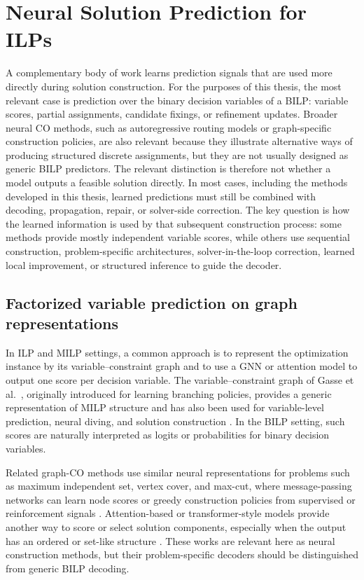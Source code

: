 \section{Neural Solution Prediction for ILPs}
\label{sec:rw_solution_prediction}

A complementary body of work learns prediction signals that are used more directly during solution construction. For the purposes of this thesis, the most relevant case is prediction over the binary decision variables of a BILP: variable scores, partial assignments, candidate fixings, or refinement updates. Broader neural CO methods, such as autoregressive routing models or graph-specific construction policies, are also relevant because they illustrate alternative ways of producing structured discrete assignments, but they are not usually designed as generic BILP predictors. The relevant distinction is therefore not whether a model outputs a feasible solution directly. In most cases, including the methods developed in this thesis, learned predictions must still be combined with decoding, propagation, repair, or solver-side correction. The key question is how the learned information is used by that subsequent construction process: some methods provide mostly independent variable scores, while others use sequential construction, problem-specific architectures, solver-in-the-loop correction, learned local improvement, or structured inference to guide the decoder.

\subsection{Factorized variable prediction on graph representations}
\label{subsec:rw_factorized_prediction}

In ILP and MILP settings, a common approach is to represent the optimization instance by its variable--constraint graph and to use a GNN or attention model to output one score per decision variable. The variable--constraint graph of Gasse et al.~\cite{gasse_exact_2019}, originally introduced for learning branching policies, provides a generic representation of MILP structure and has also been used for variable-level prediction, neural diving, and solution construction \cite{nair_solving_2020,ding_accelerating_2020}. In the BILP setting, such scores are naturally interpreted as logits or probabilities for binary decision variables.

Related graph-CO methods use similar neural representations for problems such as maximum independent set, vertex cover, and max-cut, where message-passing networks can learn node scores or greedy construction policies from supervised or reinforcement signals \cite{dai_learning_2017,li_combinatorial_2018}. Attention-based or transformer-style models provide another way to score or select solution components, especially when the output has an ordered or set-like structure \cite{vinyals_pointer_2015,kool_attention_2018}. These works are relevant here as neural construction methods, but their problem-specific decoders should be distinguished from generic BILP decoding.

